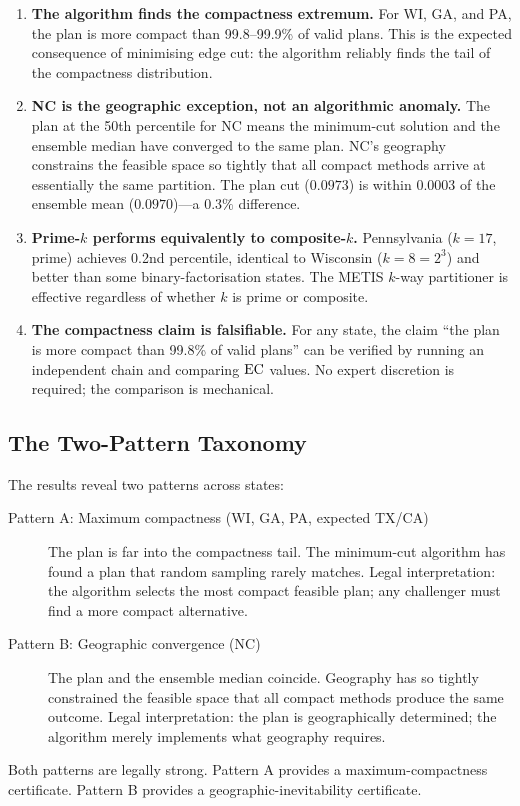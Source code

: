 \begin{enumerate}
  \item \textbf{The algorithm finds the compactness extremum.} For WI, GA, and PA,
    the \ar{} plan is more compact than 99.8--99.9\% of valid plans.  This is
    the expected consequence of minimising edge cut: the algorithm reliably
    finds the tail of the compactness distribution.

  \item \textbf{NC is the geographic exception, not an algorithmic anomaly.}
    The \ar{} plan at the 50th percentile for NC means the minimum-cut solution
    and the ensemble median have converged to the same plan.  NC's geography
    constrains the feasible space so tightly that all compact methods arrive
    at essentially the same partition.  The plan cut ($0.0973$) is within
    $0.0003$ of the ensemble mean ($0.0970$)---a $0.3\%$ difference.

  \item \textbf{Prime-$k$ performs equivalently to composite-$k$.}
    Pennsylvania ($k = 17$, prime) achieves 0.2nd percentile, identical to
    Wisconsin ($k = 8 = 2^3$) and better than some binary-factorisation
    states.  The METIS $k$-way partitioner is effective regardless of whether
    $k$ is prime or composite.

  \item \textbf{The compactness claim is falsifiable.} For any state, the
    claim ``the \ar{} plan is more compact than 99.8\% of valid plans'' can
    be verified by running an independent \recom{} chain and comparing $\mathrm{EC}$
    values.  No expert discretion is required; the comparison is mechanical.
\end{enumerate}

\subsection{The Two-Pattern Taxonomy}

The results reveal two patterns across states:

\begin{description}
  \item[Pattern A: Maximum compactness (WI, GA, PA, expected TX/CA)]
    The \ar{} plan is far into the compactness tail.  The minimum-cut
    algorithm has found a plan that random sampling rarely matches.
    Legal interpretation: the algorithm selects the most compact feasible
    plan; any challenger must find a more compact alternative.

  \item[Pattern B: Geographic convergence (NC)]
    The \ar{} plan and the ensemble median coincide.  Geography has so tightly
    constrained the feasible space that all compact methods produce the same
    outcome.  Legal interpretation: the plan is geographically determined;
    the algorithm merely implements what geography requires.
\end{description}

Both patterns are legally strong.  Pattern A provides a maximum-compactness
certificate.  Pattern B provides a geographic-inevitability certificate.
